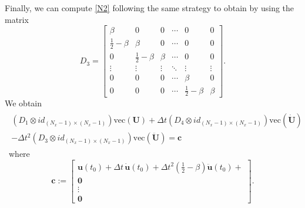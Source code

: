 \documentclass{ws-m3as}
\begin{document}
Finally, we can compute \eqref{N2} following the same strategy to obtain by using the matrix
$$
D_3 = \left[
\begin{array}{cccccc}
\beta & 0 & 0 & \cdots & 0 & 0 \\
\frac{1}{2}-\beta  & \beta & 0 & \cdots & 0 & 0 \\
0 &\frac{1}{2}-\beta  & \beta & \cdots & 0 & 0 \\
\vdots & \vdots & \vdots & \ddots & \vdots & \vdots \\
0 & 0 & 0 & \cdots & \beta & 0 \\
0 & 0 & 0 & \cdots &\frac{1}{2}-\beta & \beta 
\end{array}  
\right].
$$
We obtain
\begin{align}
\begin{array}{c}
\left( D_1 \otimes  id_{(N_x-1)\times(N_x-1)}\right) \mathrm{vec}(\mathbf{U}) + \Delta t
\left(D_4 \otimes  id_{(N_x-1)\times(N_x-1)} \right)\mathrm{vec}(\dot{\mathbf{U}}) \\ - \Delta t^2 \left( D_3 \otimes  id_{(N_x-1)\times(N_x-1)} \right) \mathrm{vec}(\ddot{\mathbf{U}}) = \mathbf{c}
\end{array}\label{newmark3}
\end{align}\
where
$$
\mathbf{c}:= \left[
\begin{array}{c}
\mathbf{u}(t_0) + \Delta t \, \dot{\mathbf{u}}(t_0) + \Delta t^2 \left(\frac{1}{2}-\beta\right)\ddot{\mathbf{u}}(t_0)+  \\
\mathbf{0} \\
\vdots \\
\mathbf{0} 
\end{array}
\right].
$$
\end{document}
